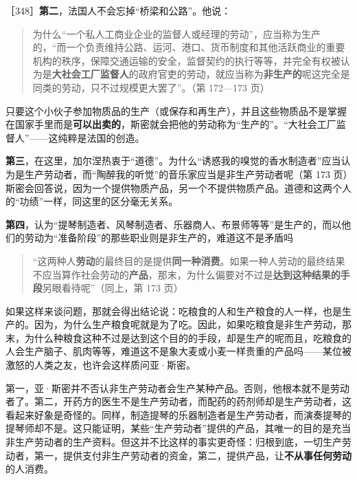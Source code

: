 ［348］\textbf{第二}，法国人不会忘掉“桥梁和公路”。他说：

\begin{quote}为什么“一个私人工商业企业的监督人或经理的劳动”，应当称为生产的，“而一个负责维持公路、运河、港口、货币制度和其他活跃商业的重要机构的秩序，保障交通运输的安全，监督契约的执行等等，并完全有权被认为是\textbf{大社会工厂监督人}的政府官吏的劳动，就应当称为\textbf{非生产的}呢这完全是同类的劳动，只不过规模更大罢了”。（第 172—173 页）\end{quote}

只要这个小伙子参加物质品的生产（或保存和再生产），并且这些物质品不是掌握在国家手里而是\textbf{可以出卖的}，斯密就会把他的劳动称为“生产的”。“大社会工厂监督人”——这纯粹是法国的创造。

\textbf{第三}，在这里，加尔涅热衷于“道德”。为什么“诱惑我的嗅觉的香水制造者”应当认为是生产劳动者，而“陶醉我的听觉”的音乐家应当是非生产劳动者呢（第 173 页）斯密会回答说，因为一个提供物质产品，另一个不提供物质产品。道德和这两个人的“功绩”一样，同这里的区分毫无关系。

\textbf{第四}，认为“提琴制造者、风琴制造者、乐器商人、布景师等等”是生产的，而以他们的劳动为“准备阶段”的那些职业则是非生产的，难道这不是矛盾吗

\begin{quote}“这两种人\textbf{劳动}的最终目的是提供\textbf{同一种消费}。如果一种人劳动的最终结果不应当算作社会劳动的\textbf{产品}，那末，为什么偏要对不过是\textbf{达到这种结果的手段}另眼看待呢”（同上，第 173 页）\end{quote}

如果这样来谈问题，那就会得出结论说：吃粮食的人和生产粮食的人一样，也是生产的。因为，为什么生产粮食呢就是为了吃。因此，如果吃粮食是非生产劳动，那末，为什么种粮食这种不过是达到这个目的的手段，却是生产的呢而且，吃粮食的人会生产脑子、肌肉等等，难道这不是象大麦或小麦一样贵重的产品吗——某位被激怒的人类之友，也许会这样质问亚·斯密。

第一，亚·斯密并不否认非生产劳动者会生产某种产品。否则，他根本就不是劳动者了。第二，开药方的医生不是生产劳动者，而配药的药剂师却是生产劳动者，这看起来好象是奇怪的。同样，制造提琴的乐器制造者是生产劳动者，而演奏提琴的提琴师却不是。这只能证明，某些“生产劳动者”提供的产品，其唯一的目的是充当非生产劳动者的生产资料。但这并不比这样的事实更奇怪：归根到底，一切生产劳动者，第一，提供支付非生产劳动者的资金，第二，提供产品，让\textbf{不从事任何劳动}的人消费。

